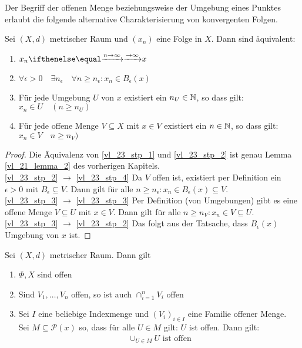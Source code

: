 Der Begriff der offenen Menge beziehungsweise der Umgebung eines Punktes erlaubt die 
folgende alternative Charakterisierung von konvergenten Folgen.

\begin{Lemma}{\label{vl_23_lemma_1}%
	Sei $(X,d)$ metrischer Raum und $(x_n)$ eine Folge in $X$. Dann sind äquivalent:
	\begin{enumerate}[label=({\roman{enumi}})]
		\item \label{vl_23_stp_1} $x_n \toinfty x$
		\item \label{vl_23_stp_2} $\forall \epsilon > 0 \quad \exists n_\epsilon \quad \forall n \geq 
			n_\epsilon: x_n \in B_\epsilon (x)$
		\item \label{vl_23_stp_3} Für jede Umgebung $U$ von $x$ existiert ein $n_U \in \mathbb{N}$, so dass 
			gilt: $x_n \in U \quad (n \geq n_U)$
		\item \label{vl_23_stp_4} Für jede offene Menge $V \subseteq X$ mit $x \in V$ existiert ein 
			$n \in \mathbb{N}$, so dass gilt: $x_n \in V \quad n \geq n_V)$
	\end{enumerate}
}\end{Lemma}
\begin{proof}
	Die Äquivalenz von \ref{vl_23_stp_1} und \ref{vl_23_stp_2} ist genau Lemma~
	\ref{vl_21_lemma_2}
	des vorherigen Kapitels. \\
	\ref{vl_23_stp_2} $\rightarrow$ \ref{vl_23_stp_4} Da $V$ offen ist, existiert 
	per Definition ein $\epsilon > 0$ mit $B_\epsilon \subseteq V$. Dann gilt 
	für alle $n \geq n_\epsilon: x_n \in B_\epsilon(x) \subseteq V$.\\
	\ref{vl_23_stp_3} $\rightarrow$ \ref{vl_23_stp_3} Per Definition (von Umgebungen) gibt es eine offene Menge $V \subseteq U$ mit $x \in V$. Dann gilt 
	für alle $n \geq n_V: x_n \in V \subseteq U$.\\
	\ref{vl_23_stp_3} $\rightarrow$ \ref{vl_23_stp_2} Das folgt aus der Tatsache, 
	dass $B_\epsilon(x)$ Umgebung von $x$ ist.
\end{proof}

\begin{Proposition}{\label{vl_23_prop_1}%
	Sei $(X,d)$ metrischer Raum. Dann gilt
	\begin{enumerate}[label=(\subscript{T}{{\arabic*}})]
		\item \label{vl_23_stp_5} $\Phi,X$ sind offen
		\item \label{vl_23_stp_6} Sind $V_1, \hdots, V_n$ offen, so ist auch $\cap_{i=1}^n V_i$ offen
		\item \label{vl_23_stp_7} Sei $I$ eine beliebige Indexmenge und $(V_i)_{i \in I}$ eine 
			Familie offener Menge.\\
			Sei $M \subseteq \mathcal{P}(x)$ so, dass für alle $U \in M$ gilt:
			$U$ ist offen. Dann gilt: 
			\begin{align*}
				\cup_{U \in M} U \text{ ist offen}
			\end{align*}
	\end{enumerate}
}\end{Proposition}

